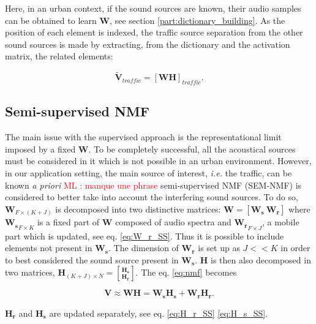 \documentclass[review,5p,twocolumn,sort&compress,times]{elsarticle}
\newcommand{\ml}[1]{\textcolor{red}{ML : #1}}
\begin{document}
Here, in an urban context, if the sound sources are known, their audio samples can be obtained to learn $\mathbf{W}$, see section \ref{part:dictionary_building}. As the position of each element is indexed, the traffic source separation from the other sound sources is made by extracting, from the dictionary and the activation matrix, the related elements:

\begin{equation}\label{eq:separationExtraction}
\mathbf{\tilde{V}}_{traffic} = \left[ \mathbf{WH} \right]_{traffic}.
\end{equation}

\subsection{Semi-supervised NMF}

The main issue with the supervised approach is the representational limit imposed by a fixed $\mathbf{W}$. To be completely successful, all the acoustical sources must be considered in it which is not possible in an urban environment. However, in our application setting, the main source of interest, \textit{i.e.} the traffic, can be known \textit{a priori} \ml{manque une phrase} semi-supervised NMF (SEM-NMF) \cite{lee_semi-supervised_2010} is considered to better take into account the interfering sound sources. To do so, $\mathbf{W}_{F \times (K+J)}$ is decomposed into two distinctive matrices: $\mathbf{W} = \left[ \mathbf{W_s}~\mathbf{W_r} \right]$ where $\mathbf{W_s}_{F \times K}$ is a fixed part of $\mathbf{W}$ composed of audio spectra and $ \mathbf{W_r}_{F \times J}$, a mobile part which is updated, see eq. \ref{eq:W_r_SS}. Thus it is possible to include elements not present in $\mathbf{W_s}$. The dimension of $\mathbf{W_r}$ is set up as $J << K$ in order to best considered the sound source present in $\mathbf{W_s}$. $\mathbf{H}$ is then also decomposed in two matrices, $\mathbf{H}_{(K+J) \times N} = \genfrac[]{0pt}{0}{\mathbf{H_s}}{\mathbf{H_r}}$. The eq. \ref{eq:nmf} becomes

\begin{equation}
\mathbf{V} \approx \mathbf{WH} = \mathbf{W_s H_s}+\mathbf{W_r H_r}.
\end{equation}

$\mathbf{H_r}$ and $\mathbf{H_s}$ are updated separately, see eq. \ref{eq:H_r_SS} \ref{eq:H_s_SS}.
\end{document}
